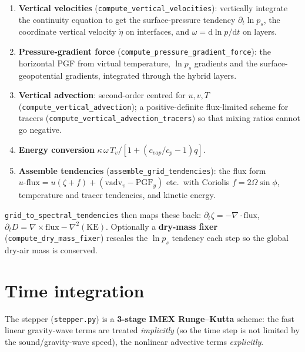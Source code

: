 \documentclass[11pt]{article}
\newcommand{\code}[1]{\texttt{#1}}
\begin{document}
\begin{enumerate}
\item \textbf{Vertical velocities} (\code{compute\_vertical\_velocities}): vertically
  integrate the continuity equation to get the surface-pressure tendency
  $\partial_t\ln p_s$, the coordinate vertical velocity $\dot\eta$ on interfaces,
  and $\omega=\mathrm{d}\ln p/\mathrm{d}t$ on layers.
\item \textbf{Pressure-gradient force} (\code{compute\_pressure\_gradient\_force}):
  the horizontal PGF from virtual temperature, $\ln p_s$ gradients and the
  surface-geopotential gradients, integrated through the hybrid layers.
\item \textbf{Vertical advection}: second-order centred for $u,v,T$
  (\code{compute\_vertical\_advection}); a positive-definite \citet{thuburn1996}
  flux-limited scheme for tracers (\code{compute\_vertical\_advection\_tracers}) so
  that mixing ratios cannot go negative.
\item \textbf{Energy conversion} $\kappa\,\omega\,T_v/[1+(c_{vap}/c_p-1)q]$.
\item \textbf{Assemble tendencies} (\code{assemble\_grid\_tendencies}): the flux form
  $u\text{-flux}=u(\zeta+f)+(\text{vadv}_v-\text{PGF}_y)$ etc.\ with Coriolis
  $f=2\Omega\sin\phi$, temperature and tracer tendencies, and kinetic energy.
\end{enumerate}
\code{grid\_to\_spectral\_tendencies} then maps these back: $\partial_t\zeta =
-\nabla\!\cdot\text{flux}$, $\partial_t D = \nabla\times\text{flux} -
\nabla^2(\text{KE})$. Optionally a \textbf{dry-mass fixer}
(\code{compute\_dry\_mass\_fixer}) rescales the $\ln p_s$ tendency each step so the
global dry-air mass is conserved.

\section{Time integration}\label{sec:stepper}

The stepper (\code{stepper.py}) is a \textbf{3-stage IMEX Runge--Kutta} scheme: the
fast linear gravity-wave terms are treated \emph{implicitly} (so the time step is
not limited by the sound/gravity-wave speed), the nonlinear advective terms
\emph{explicitly}.
\end{document}
